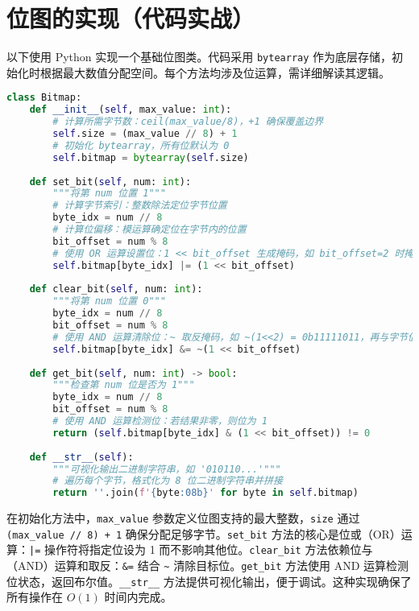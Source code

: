 \chapter{位图的实现（代码实战）}
以下使用 Python 实现一个基础位图类。代码采用 \texttt{bytearray} 作为底层存储，初始化时根据最大数值分配空间。每个方法均涉及位运算，需详细解读其逻辑。\par
\begin{lstlisting}[language=python]
class Bitmap:
    def __init__(self, max_value: int):
        # 计算所需字节数：ceil(max_value/8)，+1 确保覆盖边界
        self.size = (max_value // 8) + 1
        # 初始化 bytearray，所有位默认为 0
        self.bitmap = bytearray(self.size)
    
    def set_bit(self, num: int):
        """将第 num 位置 1"""
        # 计算字节索引：整数除法定位字节位置
        byte_idx = num // 8
        # 计算位偏移：模运算确定位在字节内的位置
        bit_offset = num % 8
        # 使用 OR 运算设置位：1 << bit_offset 生成掩码，如 bit_offset=2 时掩码为 0b00000100
        self.bitmap[byte_idx] |= (1 << bit_offset)
    
    def clear_bit(self, num: int):
        """将第 num 位置 0"""
        byte_idx = num // 8
        bit_offset = num % 8
        # 使用 AND 运算清除位：~ 取反掩码，如 ~(1<<2) = 0b11111011，再与字节值相与
        self.bitmap[byte_idx] &= ~(1 << bit_offset)
    
    def get_bit(self, num: int) -> bool:
        """检查第 num 位是否为 1"""
        byte_idx = num // 8
        bit_offset = num % 8
        # 使用 AND 运算检测位：若结果非零，则位为 1
        return (self.bitmap[byte_idx] & (1 << bit_offset)) != 0
    
    def __str__(self):
        """可视化输出二进制字符串，如 '010110...'"""
        # 遍历每个字节，格式化为 8 位二进制字符串并拼接
        return ''.join(f'{byte:08b}' for byte in self.bitmap)
\end{lstlisting}
在初始化方法中，\texttt{max\_{}value} 参数定义位图支持的最大整数，\texttt{size} 通过 \texttt{(max\_{}value // 8) + 1} 确保分配足够字节。\texttt{set\_{}bit} 方法的核心是位或（OR）运算：\texttt{|=} 操作符将指定位设为 1 而不影响其他位。\texttt{clear\_{}bit} 方法依赖位与（AND）运算和取反：\texttt{\&{}=} 结合 \texttt{\~{}} 清除目标位。\texttt{get\_{}bit} 方法使用 AND 运算检测位状态，返回布尔值。\texttt{\_{}\_{}str\_{}\_{}} 方法提供可视化输出，便于调试。这种实现确保了所有操作在 $ O(1) $ 时间内完成。\par
